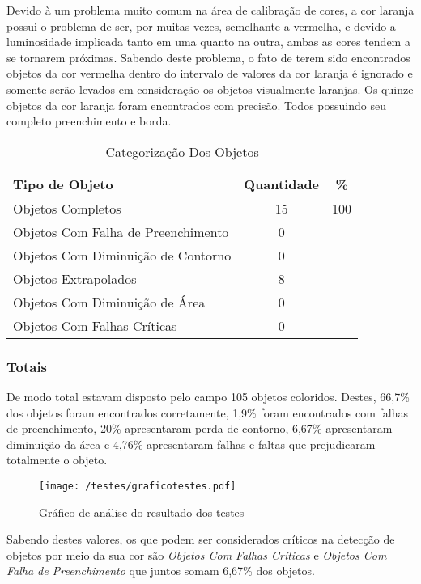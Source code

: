 	Devido à um problema muito comum na área de calibração de cores, a cor laranja possui o problema de ser, por muitas vezes, semelhante a vermelha, e devido a luminosidade implicada tanto em uma quanto na outra, ambas as cores tendem a se tornarem próximas.
	Sabendo deste problema, o fato de terem sido encontrados objetos da cor vermelha dentro do intervalo de valores da cor laranja é ignorado e somente serão levados em consideração os objetos visualmente laranjas.
	Os quinze objetos da cor laranja foram encontrados com precisão. Todos possuindo seu completo preenchimento e borda.
	
\begin{table}[h]
\centering
\begin{tabular}{l|c|c}
Tipo de Objeto & Quantidade  & \% \\ %
\hline                               %
Objetos Completos &  15 & 100 \\
\hline 
Objetos Com Falha de Preenchimento & 0 \\
\hline 
Objetos Com Diminuição de Contorno &  0 \\
\hline 
Objetos Extrapolados & 8 \\
\hline 
Objetos Com Diminuição de Área &  0 \\
\hline 
Objetos Com Falhas Críticas & 0 \\
\hline 
\end{tabular}
\caption{Categorização Dos Objetos}
\end{table}
\newpage
\subsubsection{Totais}
De modo total estavam disposto pelo campo 105 objetos coloridos. Destes, 66,7\% dos objetos foram encontrados corretamente, 1,9\% foram encontrados com falhas de preenchimento, 20\% apresentaram perda de contorno, 6,67\% apresentaram diminuição da área e 4,76\% apresentaram falhas e faltas que prejudicaram totalmente o objeto.
	\begin{figure}[H]
		\centering
		\texttt{[image: /testes/graficotestes.pdf]}
		\caption{Gráfico de análise do resultado dos testes}
		\label{disposicaoparte}
	\end{figure}
	
	
	Sabendo destes valores, os que podem ser considerados críticos na detecção de objetos por meio da sua cor são \textit{Objetos Com Falhas Críticas} e \textit{Objetos Com Falha de Preenchimento} que juntos somam 6,67\% dos objetos.